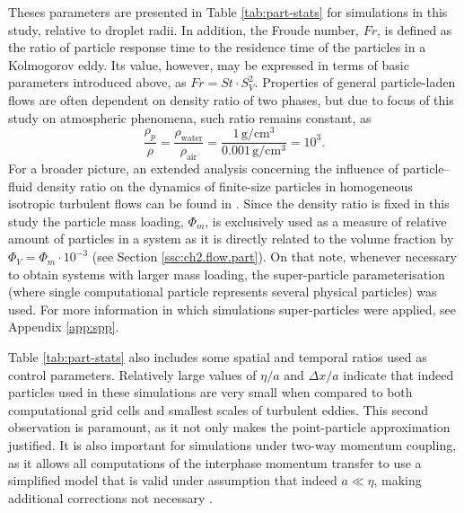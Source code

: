 \documentclass{pracamgren}
\begin{document}
Theses parameters are presented in Table \ref{tab:part-stats} for simulations in this study, relative to droplet radii.
In addition, the Froude number, $Fr$, is defined as the ratio of particle response time to the residence time of the particles in a Kolmogorov eddy.
Its value, however, may be expressed in terms of basic parameters introduced above, as $Fr = St \cdot S_V^2$.
Properties of general particle-laden flows are often dependent on density ratio of two phases, but due to focus of this study on atmospheric phenomena, such ratio remains constant, as
$$
\frac{\rho_p}{\rho} 
= \frac{\rho_{\text{water}}}{\rho_{\text{air}}} 
= \frac{1 \, \text{g} / \text{cm}^3}{0.001 \, \text{g} / \text{cm}^3} 
= 10^3 .
$$
For a broader picture, an extended analysis concerning the influence of particle–fluid density ratio on the dynamics of finite-size particles in homogeneous
isotropic turbulent flows can be found in \textcite{Shen2021}.
Since the density ratio is fixed in this study the particle mass loading, $\Phi_m$, is exclusively used as a measure of relative amount of particles in a system as it is directly related to the volume fraction by $\Phi_V = \Phi_m \cdot 10^{-3}$ (see Section \ref{ssc:ch2.flow.part}).
On that note, whenever necessary to obtain systems with larger mass loading, the super-particle parameterisation (where single computational particle represents several physical particles) was used.
For more information in which simulations super-particles were applied, see Appendix \ref{app:spp}. 

Table \ref{tab:part-stats} also includes some spatial and temporal ratios used as control parameters.
Relatively large values of $\eta / a$ and $\Delta x / a$ indicate that indeed particles used in these simulations are very small when compared to both computational grid cells and smallest scales of turbulent eddies.
This second observation is paramount, as it not only makes the point-particle approximation justified.
It is also important for simulations under two-way momentum coupling, as it allows all computations of the interphase momentum transfer to use a simplified model that is valid under assumption that indeed $a \ll \eta$, making additional corrections not necessary \parencite{Horwitz2016}.

\smallskip
\end{document}
